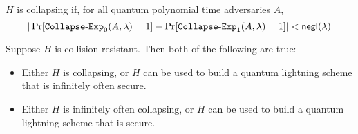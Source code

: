 \begin{definition}$H$ is collapsing if, for all quantum polynomial time adversaries $A$, \[|\Pr[{\tt{Collapse\text{-}Exp}}_0(A,\lambda)=1]-\Pr[{\tt{Collapse\text{-}Exp}}_1(A,\lambda)=1]|<{\sf negl}(\lambda)\]
\end{definition}

\begin{theorem}\label{thm:collision} Suppose $H$ is collision resistant.  Then both of the following are true:
	\begin{itemize}
		\item Either $H$ is collapsing, or $H$ can be used to build a quantum lightning scheme that is infinitely often secure.
		\item Either $H$ is infinitely often collapsing, or $H$ can be used to build a quantum lightning scheme that is secure.
	\end{itemize}
\end{theorem}

